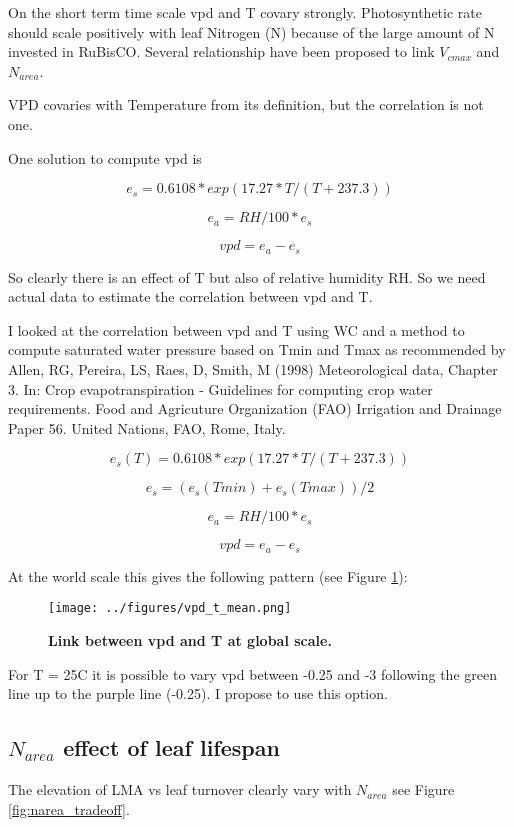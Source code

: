 \documentclass[a4paper,11pt]{article}
\begin{document}
On the short term time scale vpd and T covary strongly. Photosynthetic rate should scale positively with leaf Nitrogen (N) because of the large amount of N invested in RuBisCO. Several relationship have been proposed to link $V_{cmax}$ and $N_{area}$.

VPD covaries with Temperature from its definition, but the correlation is not one.

One solution to compute vpd is

$$e_s = 0.6108 * exp(17.27 * T / (T + 237.3))$$

$$e_a = RH / 100 * e_s $$

$$vpd = e_a - e_s$$

So clearly there is an effect of T but also of relative humidity RH.
So we need actual data to estimate the correlation between vpd and T.

I looked at the correlation between vpd and T using WC and a method to compute saturated water pressure based on Tmin and Tmax as recommended by
Allen, RG, Pereira, LS, Raes, D, Smith, M (1998) Meteorological data, Chapter 3. In: Crop evapotranspiration - Guidelines for computing crop water requirements. Food and Agricuture Organization (FAO) Irrigation and Drainage Paper 56. United Nations, FAO, Rome, Italy. 

$$e_s(T) = 0.6108 * exp(17.27 * T / (T + 237.3))$$

$$e_s = (e_s(Tmin)+e_s(Tmax))/2 $$

$$e_a = RH / 100 * e_s $$

$$vpd = e_a - e_s$$

At the world scale this gives the following pattern (see Figure \ref{fig:vpd_t}):
\begin{figure}[ht]
\centering
\texttt{[image: ../figures/vpd\_t\_mean.png]}
\caption{\textbf{Link between vpd and T at global scale.}
\label{fig:vpd_t}}
\end{figure}

 For T = 25C it is possible to vary vpd between -0.25 and -3 following the green line up to the purple line (-0.25). I propose to use this option.
 
\pagebreak
 
 \subsection{$N_{area}$ effect of leaf lifespan}

The elevation of LMA vs leaf turnover clearly vary with $N_{area}$ see Figure \ref{fig:narea_tradeoff}. 
\end{document}
